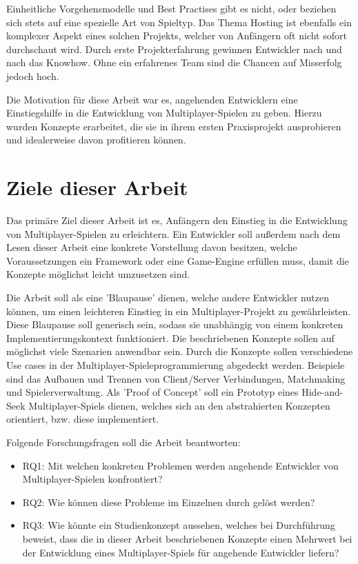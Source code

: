 Einheitliche Vorgehensmodelle und Best Practises gibt es nicht, oder beziehen sich stets auf eine spezielle Art von Spieltyp. Das Thema Hosting ist ebenfalls ein komplexer Aspekt eines solchen Projekts, welcher von Anfängern oft nicht sofort durchschaut wird. Durch erste Projekterfahrung gewinnen Entwickler nach und nach das Knowhow. Ohne ein erfahrenes Team sind die Chancen auf Misserfolg jedoch hoch. \cite{Payne.18.09.2019}

Die Motivation für diese Arbeit war es, angehenden Entwicklern eine Einstiegshilfe in die Entwicklung von Multiplayer-Spielen zu geben. Hierzu wurden Konzepte erarbeitet, die sie in ihrem ersten Praxisprojekt ausprobieren und idealerweise davon profitieren können.

\section{Ziele dieser Arbeit}

Das primäre Ziel dieser Arbeit ist es, Anfängern den Einstieg in die Entwicklung von Multiplayer-Spielen zu erleichtern. Ein Entwickler soll außerdem nach dem Lesen dieser Arbeit eine konkrete Vorstellung davon besitzen, welche Voraussetzungen ein Framework oder eine Game-Engine erfüllen muss, damit die Konzepte möglichst leicht umzusetzen sind.

Die Arbeit soll als eine 'Blaupause' dienen, welche andere Entwickler nutzen können, um einen leichteren Einstieg in ein Multiplayer-Projekt zu gewährleisten. Diese Blaupause soll generisch sein, sodass sie unabhängig von einem konkreten Implementierungskontext funktioniert. Die beschriebenen Konzepte sollen auf möglichst viele Szenarien anwendbar sein. Durch die Konzepte sollen verschiedene Use cases in der Multiplayer-Spieleprogrammierung abgedeckt werden. Beispiele sind das Aufbauen und Trennen von Client/Server Verbindungen, Matchmaking und Spielerverwaltung. Als 'Proof of Concept' soll ein Prototyp eines Hide-and-Seek Multiplayer-Spiels dienen, welches sich an den abstrahierten Konzepten orientiert, bzw. diese implementiert. 

Folgende Forschungsfragen soll die Arbeit beantworten:

\begin{itemize}
	\item \label{RQ1} RQ1: Mit welchen konkreten Problemen werden angehende Entwickler von Multiplayer-Spielen konfrontiert?
	\item \label{RQ2} RQ2: Wie können diese Probleme im Einzelnen durch gelöst werden?
	\item \label{RQ3} RQ3: Wie könnte ein Studienkonzept aussehen, welches bei Durchführung beweist, dass die in dieser Arbeit beschriebenen Konzepte einen Mehrwert bei der Entwicklung eines Multiplayer-Spiels für angehende Entwickler liefern?
\end{itemize}

